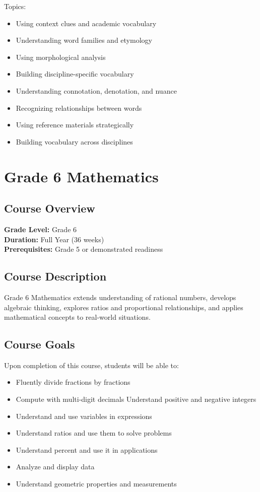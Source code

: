 \documentclass[11pt,letterpaper]{report}
\begin{document}
Topics:
\begin{itemize}
\item Using context clues and academic vocabulary
\item Understanding word families and etymology
\item Using morphological analysis
\item Building discipline-specific vocabulary
\item Understanding connotation, denotation, and nuance
\item Recognizing relationships between words
\item Using reference materials strategically
\item Building vocabulary across disciplines
\end{itemize}


\chapter{Grade 6 Mathematics}

\section{Course Overview}

\textbf{Grade Level:} Grade 6\\
\textbf{Duration:} Full Year (36 weeks)\\
\textbf{Prerequisites:} Grade 5 or demonstrated readiness

\section{Course Description}

Grade 6 Mathematics extends understanding of rational numbers, develops algebraic thinking, explores ratios and proportional relationships, and applies mathematical concepts to real-world situations.

\section{Course Goals}

Upon completion of this course, students will be able to:

\begin{itemize}
    \item Fluently divide fractions by fractions
    \item Compute with multi-digit decimals
    Understand positive and negative integers
    \item Understand and use variables in expressions
    \item Understand ratios and use them to solve problems
    \item Understand percent and use it in applications
    \item Analyze and display data
    \item Understand geometric properties and measurements
\end{itemize}
\end{document}
